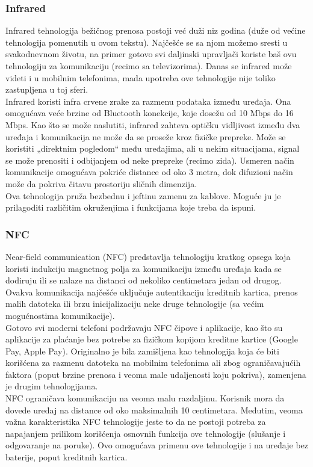 \documentclass[a4paper]{article}
\begin{document}
        \subsubsection{Infrared}
Infrared tehnologija bežičnog prenosa postoji već duži niz godina (duže od većine tehnologija pomenutih u ovom tekstu). Najčešće se sa njom možemo sresti u svakodnevnom životu, na primer gotovo svi daljinski upravljači  koriste baš ovu tehnologiju za komunikaciju (recimo sa televizorima). Danas se infrared može videti i u mobilnim telefonima, mada upotreba ove tehnologije nije toliko zastupljena u toj sferi.\\
Infrared koristi infra crvene zrake za razmenu podataka između uređaja. Ona omogućava veće brzine od Bluetooth konekcije, koje dosežu od 10 Mbps do 16 Mbps.
Kao što se može naslutiti, infrared zahteva optičku vidljivost između dva uređaja i komunikacija ne može da se proseže kroz fizičke prepreke. Može se koristiti „direktnim pogledom“ među uređajima, ali u nekim situacijama, signal se može prenositi i odbijanjem od neke prepreke (recimo zida). Usmeren način komunikacije omogućava pokriće distance od oko 3 metra, dok difuzioni način može da pokriva čitavu prostoriju sličnih dimenzija. \\
Ova tehnologija pruža bezbednu i jeftinu zamenu za kablove. Moguće ju je prilagoditi različitim okruženjima i funkcijama koje treba da ispuni.\\

        \subsubsection{NFC}
Near-field communication (NFC) predstavlja tehnologiju kratkog opsega koja koristi indukciju magnetnog polja za komunikaciju između uređaja kada se dodiruju ili se nalaze na distanci od nekoliko centimetara jedan od drugog. Ovakva komunikacija najčešće uključuje autentikaciju kreditnih kartica, prenos malih datoteka ili brzu inicijalizaciju neke druge tehnologije (sa većim mogućnostima komunikacije).\\
Gotovo svi moderni telefoni podržavaju NFC čipove i aplikacije, kao što su aplikacije za plaćanje bez potrebe za fizičkom kopijom kreditne kartice (Google Pay, Apple Pay). Originalno je bila zamišljena kao tehnologija koja će biti korišćena za razmenu datoteka na mobilnim telefonima ali zbog ograničavajućih faktora (poput brzine prenosa i veoma male udaljenosti koju pokriva), zamenjena je drugim tehnologijama.\\
NFC ograničava komunikaciju na veoma malu razdaljinu. Korisnik mora da dovede uređaj na distance od oko maksimalnih 10 centimetara. Međutim, veoma važna karakteristika NFC tehnologije jeste to da ne postoji potreba za napajanjem prilikom korišćenja osnovnih funkcija ove tehnologije (slušanje i odgovaranje na poruke). Ovo omogućava primenu ove tehnologije i na uređaje bez baterije, poput kreditnih kartica. \cite{NFC}\\
\end{document}
